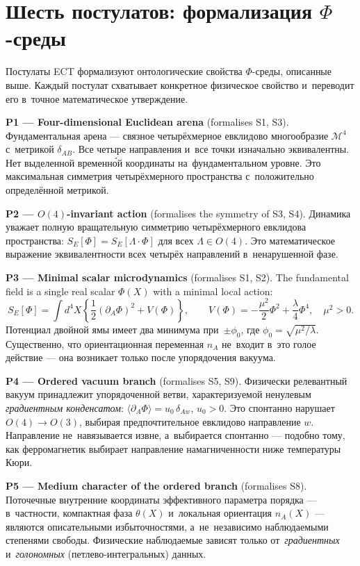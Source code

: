 \documentclass[11pt,a4paper]{article}
\begin{document}
\section{Шесть постулатов: формализация $\Phi$-среды}
\label{sec:pop_postulates}

Постулаты ECT формализуют онтологические свойства $\Phi$-среды, описанные выше. Каждый постулат схватывает конкретное физическое свойство и~переводит его в~точное математическое утверждение.

\textbf{P1 --- Four-dimensional Euclidean arena} (formalises S1, S3).
Фундаментальная арена --- связное четырёхмерное евклидово многообразие $\mathcal{M}^4$ с~метрикой $\delta_{AB}$. Все четыре направления и~все точки изначально эквивалентны. Нет выделенной временно́й координаты на~фундаментальном уровне. Это максимальная симметрия четырёхмерного пространства с~положительно определённой метрикой.

\textbf{P2 --- $O(4)$-invariant action} (formalises the symmetry of S3, S4).
Динамика уважает полную вращательную симметрию четырёхмерного евклидова пространства: $S_E[\Phi] = S_E[\Lambda \cdot \Phi]$ для всех $\Lambda \in O(4)$. Это математическое выражение эквивалентности всех четырёх направлений в~ненарушенной фазе.

\textbf{P3 --- Minimal scalar microdynamics} (formalises S1, S2).
The fundamental field is a single real scalar $\Phi(X)$ with a minimal local action:
\begin{equation}
  S_E[\Phi] = \int d^4X\left\{
  \frac{1}{2}(\partial_A\Phi)^2 + V(\Phi)\right\},
  \qquad
  V(\Phi) = -\frac{\mu^2}{2}\Phi^2 + \frac{\lambda}{4}\Phi^4,
  \quad \mu^2 > 0.
  \label{eq:pop_action}
\end{equation}
Потенциал двойной ямы имеет два минимума при~$\pm\phi_0$, где $\phi_0 = \sqrt{\mu^2/\lambda}$. Существенно, что ориентационная переменная $n_A$ не~входит в~это голое действие --- она возникает только после упорядочения вакуума.

\textbf{P4 --- Ordered vacuum branch} (formalises S5, S9).
Физически релевантный вакуум принадлежит упорядоченной ветви, характеризуемой ненулевым \emph{градиентным конденсатом}: $\langle\partial_A\Phi\rangle = u_0\,\delta_{Aw}$, $u_0 > 0$. Это спонтанно нарушает $O(4) \to O(3)$, выбирая предпочтительное евклидово направление $w$. Направление не~навязывается извне, а~выбирается спонтанно --- подобно тому, как ферромагнетик выбирает направление намагниченности ниже температуры Кюри.

\textbf{P5 --- Medium character of the ordered branch} (formalises S8).
Поточечные внутренние координаты эффективного параметра порядка --- в~частности, компактная фаза $\theta(X)$ и~локальная ориентация $n_A(X)$ --- являются описательными избыточностями, а~не~независимо наблюдаемыми степенями свободы. Физические наблюдаемые зависят только от~\emph{градиентных} и~\emph{голономных} (петлево-интегральных) данных.
\end{document}
